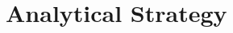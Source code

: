 \documentclass[11pt,a4paper]{scrartcl}
\newtheorem{hyp}{Hypothesis}
\begin{document}
%	
%	
%	
%	
%		
%
%		


\section{Analytical Strategy}
\end{document}
